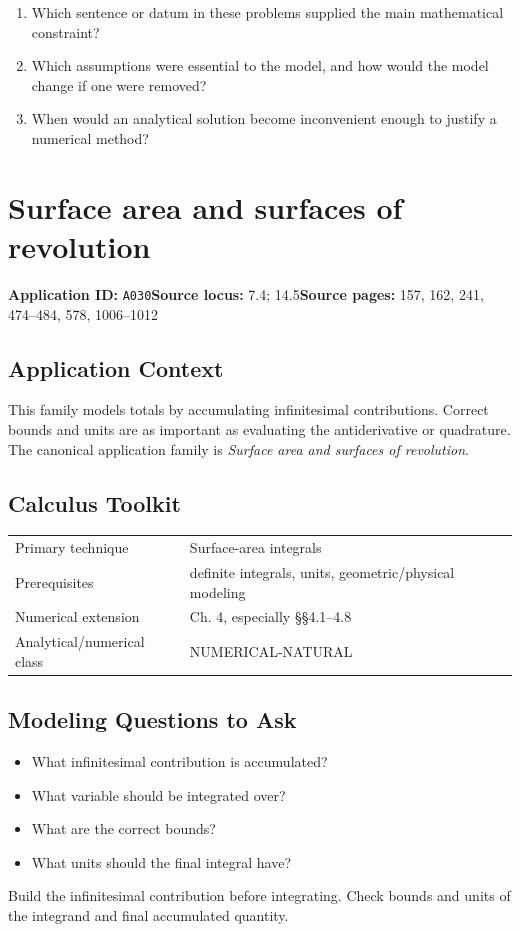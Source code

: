 \documentclass[11pt]{book}
\newcommand{\pid}[1]{\texttt{#1}}
\begin{document}
\begin{reflectionbox}\begin{enumerate}
\item Which sentence or datum in these problems supplied the main mathematical constraint?
\item Which assumptions were essential to the model, and how would the model change if one were removed?
\item When would an analytical solution become inconvenient enough to justify a numerical method?
\end{enumerate}\end{reflectionbox}
\chapter{Surface area and surfaces of revolution}\label{app:A030}
\textbf{Application ID:} \pid{A030}\quad \textbf{Source locus:} 7.4; 14.5\quad \textbf{Source pages:} 157, 162, 241, 474–484, 578, 1006–1012
\section*{Application Context}
This family models totals by accumulating infinitesimal contributions. Correct bounds and units are as important as evaluating the antiderivative or quadrature. The canonical application family is \emph{Surface area and surfaces of revolution}.
\section*{Calculus Toolkit}
\begin{tabularx}{\textwidth}{@{}lX@{}}\toprule
Primary technique & Surface-area integrals \\
Prerequisites & definite integrals, units, geometric/physical modeling \\
Numerical extension & Ch. 4, especially §§4.1–4.8 \\
Analytical/numerical class & NUMERICAL-NATURAL \\
\bottomrule\end{tabularx}
\section*{Modeling Questions to Ask}\begin{itemize}
\item What infinitesimal contribution is accumulated?
\item What variable should be integrated over?
\item What are the correct bounds?
\item What units should the final integral have?
\end{itemize}
\begin{errorbox}Build the infinitesimal contribution before integrating. Check bounds and units of the integrand and final accumulated quantity.\end{errorbox}
\end{document}
